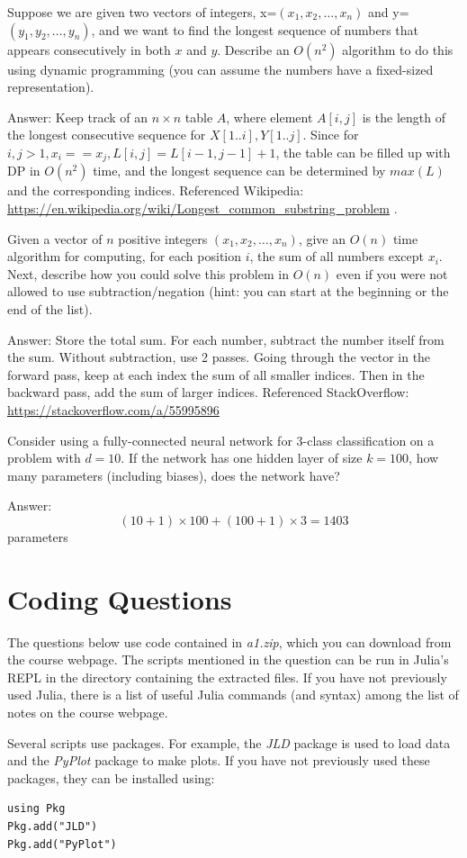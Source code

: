 \documentclass{article}
\def\ans#1{\par\gre{Answer: #1}}
\def\gre#1{{\color{gre}#1}}
\begin{document}
{{{}
\pagebreak
\item Suppose we are given two vectors of integers, x=$(x_1,x_2,\dots,x_n)$ and y=$(y_1,y_2,\dots,y_n)$, and we want to find the longest sequence of numbers that appears consecutively in both $x$ and $y$. Describe an $O(n^2)$ algorithm to do this using dynamic programming (you can assume the numbers have a fixed-sized representation).
\ans{
Keep track of an $n\times n$ table $A$, where element $A[i,j]$ is the length of the longest consecutive sequence for $X[1..i],Y[1..j]$. Since for $i,j>1, x_i==x_j, L[i,j]=L[i-1,j-1]+1$, the table can be filled up with DP in $O(n^2)$ time, and the longest sequence can be determined by $max(L)$ and the corresponding indices. Referenced Wikipedia: \url{https://en.wikipedia.org/wiki/Longest_common_substring_problem} .
}
\item Given a vector of $n$ positive integers $(x_1,x_2,\dots,x_n)$, give an $O(n)$ time algorithm for computing, for each position $i$, the sum of all numbers except $x_i$. Next, describe how you could solve this problem in $O(n)$ even if you were not allowed to use subtraction/negation (hint: you can start at the beginning or the end of the list).
\ans{
Store the total sum. For each number, subtract the number itself from the sum.
Without subtraction, use 2 passes. Going through the vector in the forward pass, keep at each index the sum of all smaller indices. Then in the backward pass, add the sum of larger indices. Referenced StackOverflow: \url{https://stackoverflow.com/a/55995896}
}
\item{Consider using a fully-connected neural network for 3-class classification on a problem with $d=10$. If the network has one hidden layer of size $k=100$, how many parameters (including biases), does the network have?}
\ans{
\[(10+1)\times 100 + (100+1)\times 3 = 1403\]
parameters
}
}
}
\pagebreak

\section{Coding Questions}

The questions below use code contained in \emph{a1.zip}, which you can download from the course webpage. The scripts mentioned in the question can be run in Julia's REPL in the directory containing the extracted files. If you have not previously used Julia, there is a list of useful Julia commands (and syntax) among the list of notes on the course webpage.

Several scripts use packages. For example, the \emph{JLD} package is used to load  data and the \emph{PyPlot} package to make  plots. If you have not previously used these packages, they can be installed using:
\begin{verbatim}
using Pkg
Pkg.add("JLD")
Pkg.add("PyPlot")
\end{verbatim}
\end{document}

